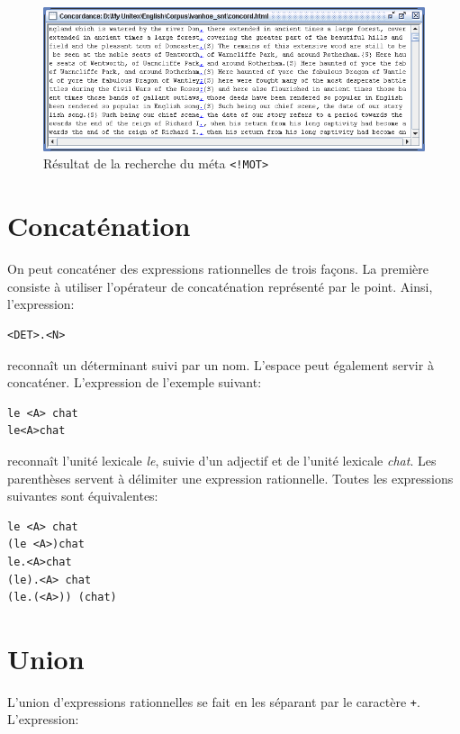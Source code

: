 \bigskip
\begin{figure}[h]
\begin{center}
\includegraphics[width=15cm]{resources/img/fig4-2.png}
\caption{Résultat de la recherche du méta
\texttt{<!MOT>}\label{fig-search-<!MOT>}}
\end{center}
\end{figure}

\section{Concaténation}

On peut concaténer des expressions rationnelles de trois façons. La première consiste à
utiliser l’opérateur de concaténation représenté par le point. Ainsi, l’expression:

\begin{verbatim}
<DET>.<N>
\end{verbatim}

\noindent reconnaît un déterminant suivi par un nom. L’espace peut également servir à concaténer.
L’expression de l’exemple suivant:


\begin{verbatim}
le <A> chat
le<A>chat
\end{verbatim}

\noindent reconnaît l’unité lexicale \textit{le}, suivie d’un adjectif et de l’unité lexicale \textit{chat}.
Les parenthèses  servent à délimiter une expression rationnelle.
Toutes les expressions suivantes sont équivalentes:


\begin{verbatim}
le <A> chat
(le <A>)chat
le.<A>chat
(le).<A> chat
(le.(<A>)) (chat)
\end{verbatim}

\section{Union}
\index{\verb$+$}
L’union d’expressions rationnelles se fait en les séparant par le caractère \verb$+$.
L’expression:

